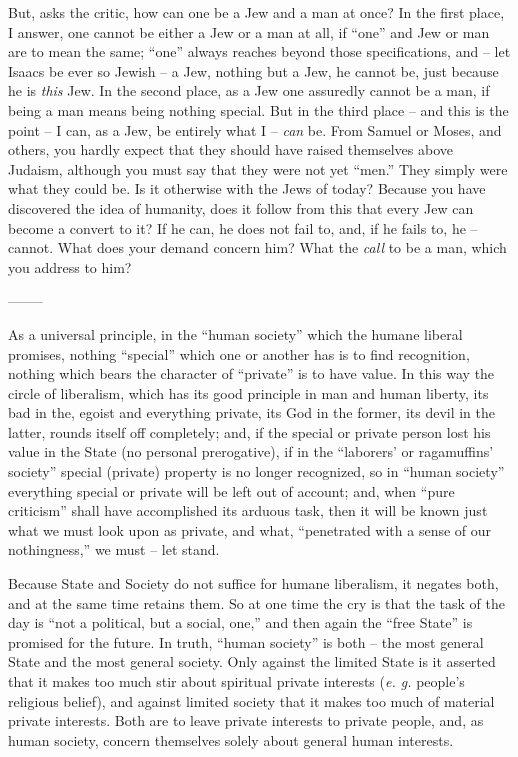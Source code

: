 \documentclass[12pt,a4paper]{book}
\begin{document}
But, asks the critic, how can one be a Jew and a man at once? In the first 
place, I answer, one cannot be either a Jew or a man at all, if ``one'' and 
Jew or man are to mean the same; ``one'' always reaches beyond those 
specifications, and -- let Isaacs be ever so Jewish -- a Jew, nothing but a 
Jew, he cannot be, just because he is \textit{this} Jew. In the second place, 
as a Jew one assuredly cannot be a man, if being a man means being nothing 
special. But in the third place -- and this is the point -- I can, as a Jew, 
be entirely what I -- \textit{can} be. From Samuel or Moses, and others, you 
hardly expect that they should have raised themselves above Judaism, although 
you must say that they were not yet ``men.'' They simply were what they 
could be. Is it otherwise with the Jews of today? Because you have discovered 
the idea of humanity, does it follow from this that every Jew can become a 
convert to it? If he can, he does not fail to, and, if he fails to, he -- 
cannot. What does your demand concern him? What the \textit{call} to be a man, 
which you address to him?

\begin{center}
--------\end{center}


As a universal principle, in the ``human society'' which the humane liberal 
promises, nothing ``special'' which one or another has is to find 
recognition, nothing which bears the character of ``private'' is to have 
value. In this way the circle of liberalism, which has its good principle in 
man and human liberty, its bad in the, egoist and everything private, its God 
in the former, its devil in the latter, rounds itself off completely; and, if 
the special or private person lost his value in the State (no personal 
prerogative), if in the ``laborers' or ragamuffins' society'' special 
(private) property is no longer recognized, so in ``human society'' 
everything special or private will be left out of account; and, when ``pure 
criticism'' shall have accomplished its arduous task, then it will be known 
just what we must look upon as private, and what, ``penetrated with a sense 
of our nothingness,'' we must -- let stand.

Because State and Society do not suffice for humane liberalism, it negates 
both, and at the same time retains them. So at one time the cry is that the 
task of the day is ``not a political, but a social, one,'' and then again 
the ``free State'' is promised for the future. In truth, ``human society'' 
is both -- the most general State and the most general society. Only against 
the limited State is it asserted that it makes too much stir about spiritual 
private interests (\textit{e. g.} people's religious belief), and against 
limited society that it makes too much of material private interests. Both are 
to leave private interests to private people, and, as human society, concern 
themselves solely about general human interests.
\end{document}
